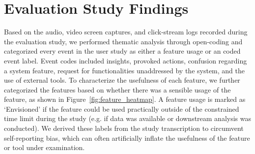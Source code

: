 \section{Evaluation Study Findings\label{sec:eval_findings}}
Based on the audio, video screen captures, and click-stream logs recorded during the evaluation study, we performed thematic analysis through open-coding and categorized every event in the user study as either a feature usage or an coded event label. Event codes included insights, provoked actions, confusion regarding a system feature, request for functionalities unaddressed by the system, and the use of external tools.
To characterize the usefulness of each feature, we further categorized the features based on whether there was a sensible usage of the feature, as shown in Figure~\ref{fig:feature_heatmap}. A feature usage is marked as `Envisioned' if the feature could be used practically outside of the constrained time limit during the study (e.g. if data was available or downstream analysis was conducted).
We derived these labels from the study transcription to circumvent self-reporting bias, which can often artificially inflate the usefulness of the feature or tool under examination.

